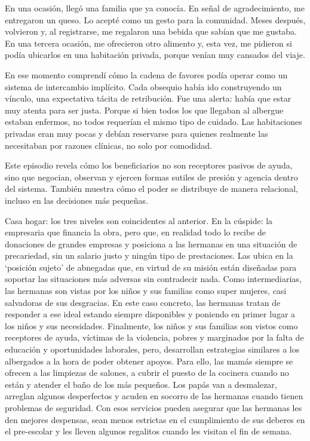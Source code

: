 \documentclass[
  spanish,
  11pt,
  a4paper,
]{scrbook}
\begin{document}
En una ocasión, llegó una familia que ya conocía. En señal de
agradecimiento, me entregaron un queso. Lo acepté como un gesto para la
comunidad. Meses después, volvieron y, al registrarse, me regalaron una
bebida que sabían que me gustaba. En una tercera ocasión, me ofrecieron
otro alimento y, esta vez, me pidieron si podía ubicarlos en una
habitación privada, porque venían muy cansados del viaje.

En ese momento comprendí cómo la cadena de favores podía operar como un
sistema de intercambio implícito. Cada obsequio había ido construyendo
un vínculo, una expectativa tácita de retribución. Fue una alerta: había
que estar muy atenta para ser justa. Porque si bien todos los que
llegaban al albergue estaban enfermos, no todos requerían el mismo tipo
de cuidado. Las habitaciones privadas eran muy pocas y debían reservarse
para quienes realmente las necesitaban por razones clínicas, no solo por
comodidad.

Este episodio revela cómo los beneficiarios no son receptores pasivos de
ayuda, sino que negocian, observan y ejercen formas sutiles de presión y
agencia dentro del sistema. También muestra cómo el poder se distribuye
de manera relacional, incluso en las decisiones más pequeñas.

Casa hogar: los tres niveles son coincidentes al anterior. En la
cúspide: la empresaria que financia la obra, pero que, en realidad todo
lo recibe de donaciones de grandes empresas y posiciona a las hermanas
en una situación de precariedad, sin un salario justo y ningún tipo de
prestaciones. Las ubica en la `posición sujeto' de abnegadas que, en
virtud de su misión están diseñadas para soportar las situaciones más
adversas sin contradecir nada. Como intermediarias, las hermanas son
vistas por los niños y sus familias como super mujeres, casi salvadoras
de sus desgracias. En este caso concreto, las hermanas tratan de
responder a ese ideal estando siempre disponibles y poniendo en primer
lugar a los niños y sus necesidades. Finalmente, los niños y sus
familias son vistos como receptores de ayuda, víctimas de la violencia,
pobres y marginados por la falta de educación y oportunidades laborales,
pero, desarrollan estrategias similares a los albergados a la hora de
poder obtener apoyos. Para ello, las mamás siempre se ofrecen a las
limpiezas de salones, a cubrir el puesto de la cocinera cuando no están
y atender el baño de los más pequeños. Los papás van a desmalezar,
arreglan algunos desperfectos y acuden en socorro de las hermanas cuando
tienen problemas de seguridad. Con esos servicios pueden asegurar que
las hermanas les den mejores despensas, sean menos estrictas en el
cumplimiento de sus deberes en el pre-escolar y les lleven algunos
regalitos cuando les visitan el fin de semana.
\end{document}
